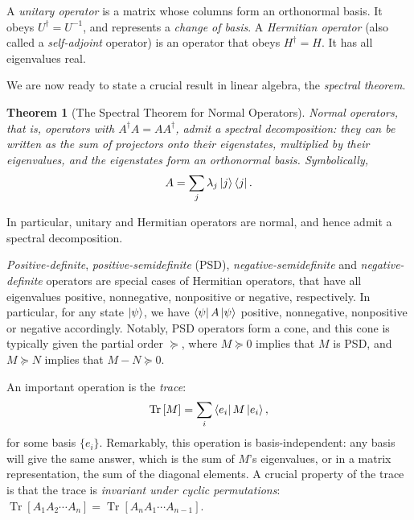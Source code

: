 \documentclass[10pt, a4paper]{article}
\numberwithin{equation}{section} %
\newcounter{stmt} %
\theoremstyle{definition}
\theoremstyle{plain}
\newtheorem{theorem}[stmt]{Theorem}
\newcommand{\?}{\mathrel{?}} %
\newcommand{\Tr}[2][]{\mathop{\mathrm{Tr}#1}\left[ #2 \right]} %
\begin{document}
\begin{appendices}
                  A \emph{unitary operator} is a matrix whose columns form an orthonormal basis. It obeys \(U^{\dagger} = U^{-1}\), and represents a \emph{change of basis}. A \emph{Hermitian operator} (also called a \emph{self-adjoint} operator) is an operator that obeys \(H^{\dagger} = H\). It has all eigenvalues real.

                    We are now ready to state a crucial result in linear algebra, the \emph{spectral theorem}.
                    \begin{theorem}[The Spectral Theorem for Normal Operators]
                      Normal operators, that is, operators with \(A^{\dagger}A = AA^{\dagger}\), admit a \emph{spectral decomposition}: they can be written as the sum of projectors onto their eigenstates, multiplied by their eigenvalues, and the eigenstates form an orthonormal basis. Symbolically,
                      \begin{equation}
                        A = \sum_j \lambda_j \ket{j}\bra{j}.
                      \end{equation}
                    \end{theorem}
                    In particular, unitary and Hermitian operators are normal, and hence admit a spectral decomposition.

                    \emph{Positive-definite}, \emph{positive-semidefinite} (PSD), \emph{negative-semidefinite} and \emph{negative-definite} operators are special cases of Hermitian operators, that have all eigenvalues positive, nonnegative, nonpositive or negative, respectively. In particular, for any state \(\ket{\psi}\), we have \(\bra{\psi}A\ket{\psi}\) positive, nonnegative, nonpositive or negative accordingly. Notably, PSD operators form a cone, and this cone is typically given the partial order \(\succeq\), where \(M \succeq 0\) implies that \(M\) is PSD, and \(M \succeq N\) implies that \(M-N \succeq 0\). 

                    An important operation is the \emph{trace}:
                    \begin{equation}
                      \Tr{M} = \sum_i \bra{e_i}M\ket{e_i},
                    \end{equation}
                    for some basis \(\{e_i\}\). Remarkably, this operation is basis-independent: any basis will give the same answer, which is the sum of \(M\)'s eigenvalues, or in a matrix representation, the sum of the diagonal elements. A crucial property of the trace is that the trace is \emph{invariant under cyclic permutations}: \(\Tr{A_1 A_2 \cdots A_n} = \Tr{A_n A_1 \cdots A_{n-1}}\).


\end{appendices}
\end{document}
